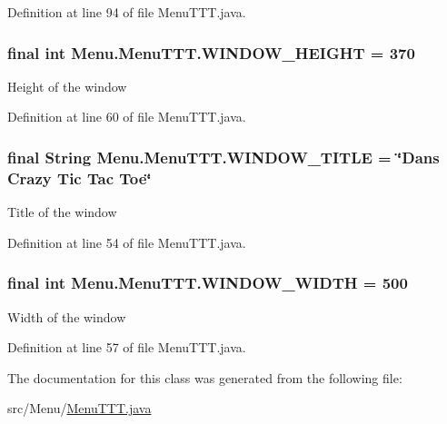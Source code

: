 Definition at line 94 of file Menu\+T\+T\+T.\+java.

\hypertarget{class_menu_1_1_menu_t_t_t_a5f9a3dacb45dd6f4f1749aa86d1b1154}{}
\subsubsection[{W\+I\+N\+D\+O\+W\+\_\+\+H\+E\+I\+G\+H\+T}]{\setlength{\rightskip}{0pt plus 5cm}final int Menu.\+Menu\+T\+T\+T.\+W\+I\+N\+D\+O\+W\+\_\+\+H\+E\+I\+G\+H\+T = 370\hspace{0.3cm}{\ttfamily [private]}}\label{class_menu_1_1_menu_t_t_t_a5f9a3dacb45dd6f4f1749aa86d1b1154}
Height of the window 

Definition at line 60 of file Menu\+T\+T\+T.\+java.

\hypertarget{class_menu_1_1_menu_t_t_t_a415b411bb82c4159d053e2e3a87a9061}{}
\subsubsection[{W\+I\+N\+D\+O\+W\+\_\+\+T\+I\+T\+L\+E}]{\setlength{\rightskip}{0pt plus 5cm}final String Menu.\+Menu\+T\+T\+T.\+W\+I\+N\+D\+O\+W\+\_\+\+T\+I\+T\+L\+E = \char`\"{}Dans Crazy Tic Tac Toe\char`\"{}\hspace{0.3cm}{\ttfamily [private]}}\label{class_menu_1_1_menu_t_t_t_a415b411bb82c4159d053e2e3a87a9061}
Title of the window 

Definition at line 54 of file Menu\+T\+T\+T.\+java.

\hypertarget{class_menu_1_1_menu_t_t_t_a07f18d5ed40cd020290f7cb16ffadca8}{}
\subsubsection[{W\+I\+N\+D\+O\+W\+\_\+\+W\+I\+D\+T\+H}]{\setlength{\rightskip}{0pt plus 5cm}final int Menu.\+Menu\+T\+T\+T.\+W\+I\+N\+D\+O\+W\+\_\+\+W\+I\+D\+T\+H = 500\hspace{0.3cm}{\ttfamily [private]}}\label{class_menu_1_1_menu_t_t_t_a07f18d5ed40cd020290f7cb16ffadca8}
Width of the window 

Definition at line 57 of file Menu\+T\+T\+T.\+java.



The documentation for this class was generated from the following file\+:\begin{DoxyCompactItemize}
\item 
src/\+Menu/\hyperlink{_menu_t_t_t_8java}{Menu\+T\+T\+T.\+java}\end{DoxyCompactItemize}
